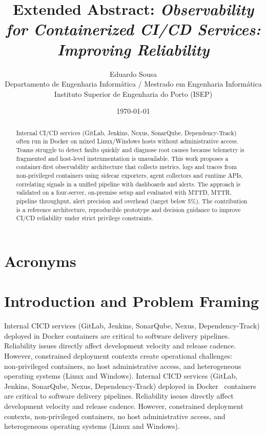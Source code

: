 \documentclass[12pt]{article}
\title{Extended Abstract: \textit{Observability for Containerized CI/CD Services: Improving Reliability}}
\author{Eduardo Sousa \\ Departamento de Engenharia Informática / Mestrado em Engenharia Informática \\ Instituto Superior de Engenharia do Porto (ISEP)}
\date{\today}
\begin{document}
\maketitle

\begin{abstract}
Internal CI/CD services (GitLab, Jenkins, Nexus, SonarQube, Dependency‑Track) often run in Docker on mixed Linux/Windows hosts without administrative access. Teams struggle to detect faults quickly and diagnose root causes because telemetry is fragmented and host‑level instrumentation is unavailable. This work proposes a container‑first observability architecture that collects metrics, logs and traces from non‑privileged containers using sidecar exporters, agent collectors and runtime APIs, correlating signals in a unified pipeline with dashboards and alerts. The approach is validated on a four‑server, on‑premise setup and evaluated with MTTD, MTTR, pipeline throughput, alert precision and overhead (target below 5\%). The contribution is a reference architecture, reproducible prototype and decision guidance to improve CI/CD reliability under strict privilege constraints.
\end{abstract}

\clearpage
\tableofcontents

\clearpage
\section*{Acronyms}
\begin{acronym}
\end{acronym}

\clearpage
\pagestyle{plain}
\setcounter{page}{1}
\section{Introduction and Problem Framing}

Internal \ac{CICD} services (GitLab, Jenkins, SonarQube, Nexus, Dependency‑Track) deployed in Docker containers are critical to software delivery pipelines. Reliability issues directly affect development velocity and release cadence. However, constrained deployment contexts create operational challenges: non‑privileged containers, no host administrative access, and heterogeneous operating systems (Linux and Windows).
Internal \ac{CICD} services (GitLab, Jenkins, SonarQube, Nexus, Dependency‑Track) deployed in Docker~\cite{docker2014} containers are critical to software delivery pipelines. Reliability issues directly affect development velocity and release cadence. However, constrained deployment contexts, non‑privileged containers, no host administrative access, and heterogeneous operating systems (Linux and Windows).
\end{document}
